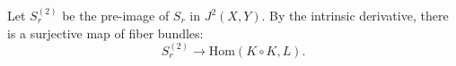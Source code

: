 Let $S_{r}^{(2)}$ be the pre-image of $S_r$ in $J^2(X, Y)$. By the intrinsic derivative, there is a surjective map of fiber bundles:
$$S_{r}^{(2)} \longrightarrow \text{Hom}(K \circ K, L).$$
